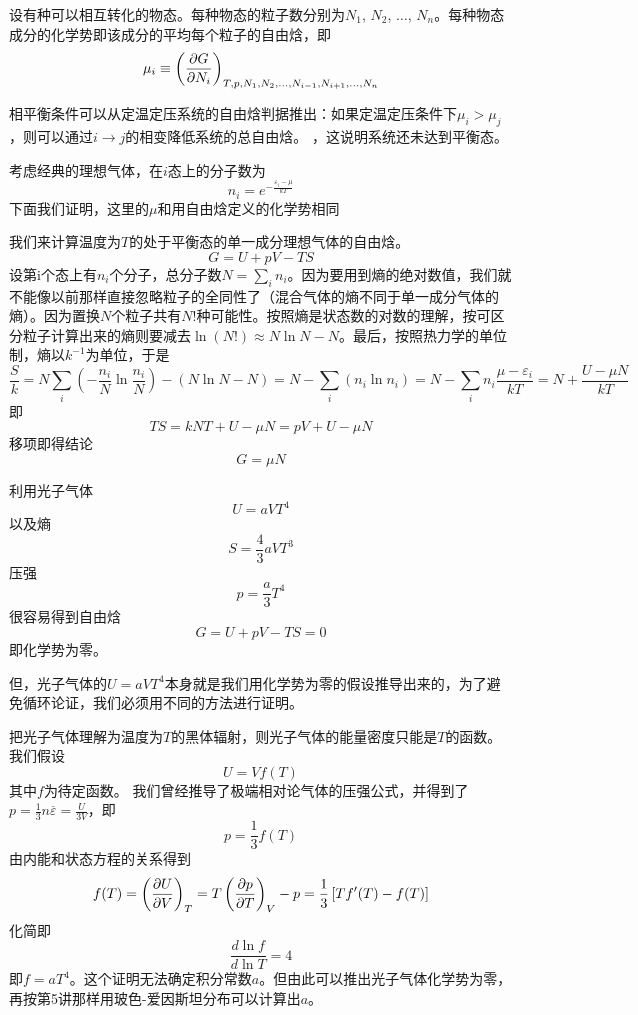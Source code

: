 \documentclass[CJK]{beamer}
\begin{document}
\begin{frame}
\bch
设有种可以相互转化的物态。每种物态的粒子数分别为$N_1$, $N_2$, $\ldots$, $N_n$。每种物态成分的化学势即该成分的平均每个粒子的自由焓，即
$$ \mu_i \equiv \left(\frac{\partial G}{\partial N_i}\right)_{T,p,N_1, N_2, \ldots, N_{i-1}, N_{i+1}, \ldots, N_n} $$

\skipline

相平衡条件可以从定温定压系统的自由焓判据推出：如果定温定压条件下$ \mu_i > \mu_j$，则可以通过$i\rightarrow j$的相变降低系统的总自由焓。
，这说明系统还未达到平衡态。
\ech
\end{frame}


\begin{frame}
\bch
{\small
考虑经典的理想气体，在$i$态上的分子数为
$$ n_i = e^{-\frac{\varepsilon_i-\mu}{kT}}$$
下面我们证明，这里的$\mu$和用自由焓定义的化学势相同}

{\scriptsize
  我们来计算温度为$T$的处于平衡态的单一成分理想气体的自由焓。
  $$G = U + pV - TS$$
  设第i个态上有$n_i$个分子，总分子数$N=\sum_i n_i$。因为要用到熵的绝对数值，我们就不能像以前那样直接忽略粒子的全同性了（混合气体的熵不同于单一成分气体的熵）。因为置换$N$个粒子共有$N!$种可能性。按照熵是状态数的对数的理解，按可区分粒子计算出来的熵则要减去$\ln (N!) \approx N \ln N - N $。最后，按照热力学的单位制，熵以$k^{-1}$为单位，于是
  $$\frac{S}{k} = N\sum_i\left(-\frac{n_i}{N}\ln\frac{n_i}{N}\right)  - (N\ln N - N) = N-\sum_i (n_i\ln n_i) = N - \sum_in_i\frac{\mu - \varepsilon_i}{kT} =N+\frac{U-\mu N}{kT}  $$
  即
  $$TS = kNT + U - \mu N = pV + U - \mu N$$
  移项即得结论$$ G = \mu N$$
}
\ech
\end{frame}

\begin{frame}
\bch
利用光子气体
$$U = aV T^4$$
以及熵
$$ S = \frac{4}{3}aV T^3$$
压强
$$ p = \frac{a}{3} T^4$$
很容易得到自由焓
$$ G = U + pV - TS = 0$$
即化学势为零。

但，光子气体的$U = aVT^4$本身就是我们用化学势为零的假设推导出来的，为了避免循环论证，我们必须用不同的方法进行证明。
\ech
\end{frame}


\begin{frame}
\bch
{\small
把光子气体理解为温度为$T$的黑体辐射，则光子气体的能量密度只能是$T$的函数。我们假设
$$ U = V f(T)$$
其中$f$为待定函数。
我们曾经推导了极端相对论气体的压强公式，并得到了$p = \frac{1}{3} n\overline{\varepsilon} = \frac{U}{3V} $，即
$$p = \frac{1}{3} f(T)$$
由内能和状态方程的关系得到
$$ f(T) = \left(\frac{\partial U}{\partial V}\right)_{T} = T\left(\frac{\partial p}{\partial T}\right)_{V} - p = \frac{1}{3} \left[T f'(T) - f(T)\right]$$
化简即
$$ \frac{d \ln f}{d\ln T}  = 4 $$
即$ f = a T^4 $。这个证明无法确定积分常数$a$。但由此可以推出光子气体化学势为零，再按第5讲那样用玻色-爱因斯坦分布可以计算出$a$。
}
\ech
\end{frame}
\end{document}
